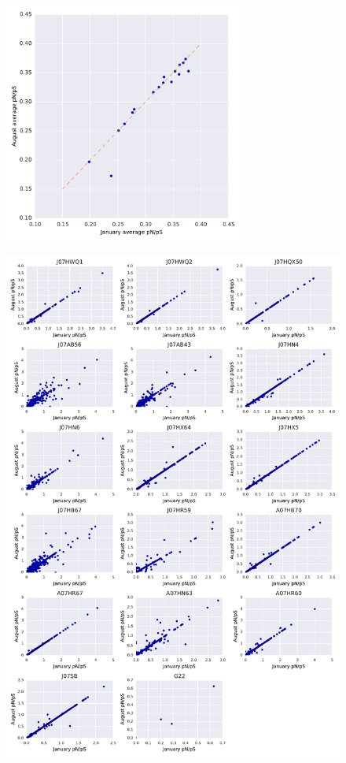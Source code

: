 \begin{figure}[!hbtp]
  \centering
  \includegraphics[width=0.7\textwidth,height=\textheight,keepaspectratio]{Chapter5/Figures/Scatter_Genomes_pNpS.pdf}
  \caption{}
  \label{Genome_comp_pNpS}
\end{figure}


\begin{figure}[!hbtp]
  \centering
  \includegraphics[width=\textwidth,height=\textheight,keepaspectratio]{Chapter5/Figures/COG_Average_pNpS.pdf}
  \caption{}
  \label{COG_pNpS_avg}
\end{figure}


